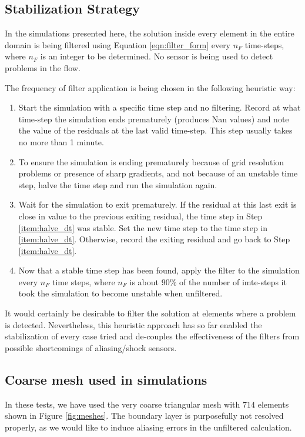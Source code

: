 \subsection{Stabilization Strategy}
In the simulations presented here, the solution inside every element in the entire domain is being filtered using Equation \ref{eqn:filter_form} every $n_F$ time-steps, where $n_F$ is an integer to be determined. No sensor is being used to detect problems in the flow.

The frequency of filter application is being chosen in the following heuristic way:
\begin{enumerate}[1.]
\item \label{item:start}Start the simulation with a specific time step and no filtering. Record at what time-step the simulation ends prematurely (produces Nan values) and note the value of the residuals at the last valid time-step.  This step usually takes no more than 1 minute.
\item \label{item:halve_dt}To ensure the simulation is ending prematurely because of grid resolution problems or presence of sharp gradients, and not because of an unstable time step, halve the time step and run the simulation again.
\item \label{item:check_res} Wait for the simulation to exit prematurely. If the residual at this last exit is close in value to the previous exiting residual, the time step in Step \ref{item:halve_dt} was stable. Set the new time step to the time step in \ref{item:halve_dt}. Otherwise, record the exiting residual and go back to Step \ref{item:halve_dt}.
\item Now that a stable time step has been found, apply the filter to the simulation every $n_F$ time steps, where $n_F$ is about $90\%$ of the number of imte-steps it took the simulation to become unstable when unfiltered.
\end{enumerate}

It would certainly be desirable to filter the solution at elements where a problem is detected. Nevertheless, this heuristic approach has so far enabled the stabilization of every case tried and de-couples the effectiveness of the filters from possible shortcomings of aliasing/shock sensors.

\subsection{Coarse mesh used in simulations}
In these tests, we have used the very coarse triangular mesh with $714$ elements shown in Figure \ref{fig:meshes}. The boundary layer is purposefully not resolved properly, as we would like to induce aliasing errors in the unfiltered calculation.

